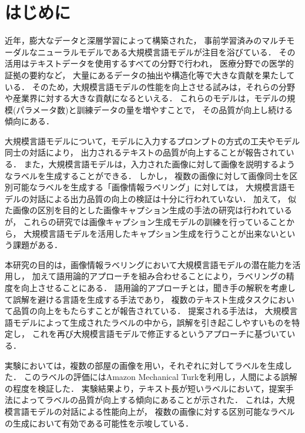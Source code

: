 \documentclass[a4paper,11pt]{jreport}
\begin{document}
\pagebreak \setcounter{page}{1}


\chapter{はじめに}

近年，膨大なデータと深層学習によって構築された，
事前学習済みのマルチモーダルなニューラルモデルである大規模言語モデルが注目を浴びている\cite{Yin2023}．
その活用はテキストデータを使用するすべての分野で行われ，
医療分野での医学的証拠の要約など，
大量にあるデータの抽出や構造化等で大きな貢献を果たしている\cite{Tang2023}．
そのため，大規模言語モデルの性能を向上させる試みは，それらの分野や産業界に対する大きな貢献になるといえる．
これらのモデルは，モデルの規模(パラメータ数)と訓練データの量を増やすことで，
その品質が向上し続ける傾向にある\cite{Devlin2019}．

大規模言語モデルについて，モデルに入力するプロンプトの方式の工夫やモデル同士の対話により，
出力されるテキストの品質が向上することが報告されている\cite{Wei2022, Zhou2022, Madaan2023, Zheng2023,LiRuosen2023}．
また，大規模言語モデルは，入力された画像に対して画像を説明するようなラベルを生成することができる．
しかし，
複数の画像に対して画像同士を区別可能なラベルを生成する「画像情報ラベリング」に対しては，
大規模言語モデルの対話による出力品質の向上の検証は十分に行われていない．
加えて，
似た画像の区別を目的とした画像キャプション生成の手法の研究は行われている\cite{Vedantam2017,Cohn-Gordon2018,Nie2020,Andreas2016}が，
これらの研究では画像キャプション生成モデルの訓練を行っていることから，
大規模言語モデルを活用したキャプション生成を行うことが出来ないという課題がある．

本研究の目的は，画像情報ラベリングにおいて大規模言語モデルの潜在能力を活用し，
加えて語用論的アプローチを組み合わせることにより，ラベリングの精度を向上させることにある．
語用論的アプローチとは，聞き手の解釈を考慮して誤解を避ける言語を生成する手法であり，
複数のテキスト生成タスクにおいて品質の向上をもたらすことが報告されている．
提案される手法は，
大規模言語モデルによって生成されたラベルの中から，誤解を引き起こしやすいものを特定し，
これを再び大規模言語モデルで修正するというアプローチに基づいている．

実験においては，複数の部屋の画像を用い，それぞれに対してラベルを生成した．
このラベルの評価にはAmazon Mechanical Turkを利用し，人間による誤解の程度を検証した．
実験結果より，テキスト長が短いラベルにおいて，提案手法によってラベルの品質が向上する傾向にあることが示された．
これは，大規模言語モデルの対話による性能向上が，
複数の画像に対する区別可能なラベルの生成において有効である可能性を示唆している．
\end{document}
